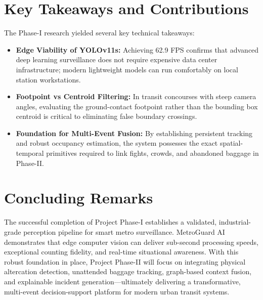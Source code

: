 \documentclass[12pt,a4paper]{report}
\begin{document}
\section{Key Takeaways and Contributions}
The Phase-I research yielded several key technical takeaways:
\begin{itemize}
    \item \textbf{Edge Viability of YOLOv11s:} Achieving 62.9 FPS confirms that advanced deep learning surveillance does not require expensive data center infrastructure; modern lightweight models can run comfortably on local station workstations.
    \item \textbf{Footpoint vs Centroid Filtering:} In transit concourses with steep camera angles, evaluating the ground-contact footpoint rather than the bounding box centroid is critical to eliminating false boundary crossings.
    \item \textbf{Foundation for Multi-Event Fusion:} By establishing persistent tracking and robust occupancy estimation, the system possesses the exact spatial-temporal primitives required to link fights, crowds, and abandoned baggage in Phase-II.
\end{itemize}

\section{Concluding Remarks}
The successful completion of Project Phase-I establishes a validated, industrial-grade perception pipeline for smart metro surveillance. MetroGuard AI demonstrates that edge computer vision can deliver sub-second processing speeds, exceptional counting fidelity, and real-time situational awareness. With this robust foundation in place, Project Phase-II will focus on integrating physical altercation detection, unattended baggage tracking, graph-based context fusion, and explainable incident generation---ultimately delivering a transformative, multi-event decision-support platform for modern urban transit systems.
\end{document}

